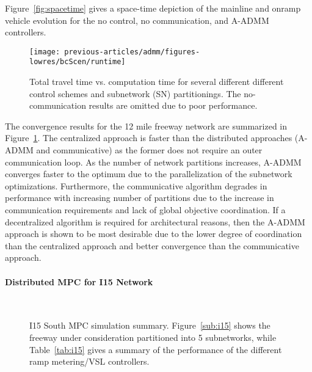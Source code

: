 Figure~\ref{fig:spacetime} gives a space-time depiction of the mainline and onramp vehicle evolution for the no control, no communication, and A-ADMM controllers.

\begin{figure}[t]
  \centering
  \texttt{[image: previous-articles/admm/figures-lowres/bcScen/runtime]}
  \caption{Total travel time vs. computation time for several different different control schemes and subnetwork (SN) partitionings. The no-communication results are omitted due to poor performance.}
  \label{fig:runtime}
\end{figure}

The convergence results for the 12 mile freeway network are summarized in Figure~\ref{fig:runtime}. The centralized approach is faster than the distributed approaches (A-ADMM and communicative) as the former does not require an outer communication loop. As the number of network partitions increases, A-ADMM converges faster to the optimum due to the parallelization of the subnetwork optimizations. Furthermore, the communicative algorithm degrades in performance with increasing number of partitions due to the increase in communication requirements and lack of global objective coordination. If a decentralized algorithm is required for architectural reasons, then the A-ADMM approach is shown to be most desirable due to the lower degree of coordination than the centralized approach and better convergence than the communicative approach.

\paragraph{Distributed MPC for I15 Network}

\begin{figure}[ht]
  \centering
   \\
    \caption[I15 South MPC simulation summary for distributed A-ADMM controller.]{I15 South MPC simulation summary. Figure~\ref{sub:i15} shows the freeway under consideration partitioned into 5 subnetworks, while Table~\ref{tab:i15} gives a summary of the performance of the different ramp metering/VSL controllers.}
    \label{fig:i15-admm}
\end{figure}

